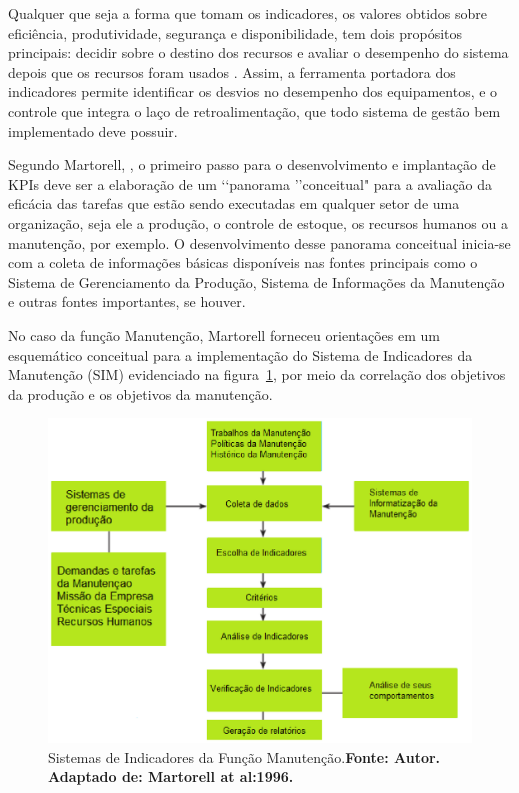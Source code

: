 Qualquer que seja a forma que tomam os indicadores, os valores obtidos sobre eficiência, produtividade, segurança e disponibilidade, tem dois propósitos principais: decidir sobre o destino dos recursos e avaliar o desempenho do sistema depois que os recursos foram usados \cite{lofsten1998}. Assim, a ferramenta portadora dos indicadores permite identificar os desvios no desempenho dos equipamentos, e o controle que integra o laço de retroalimentação, que todo sistema de gestão bem implementado deve possuir. 

Segundo Martorell, \cite{martorell1999}, o primeiro passo para o desenvolvimento e implantação de KPIs deve ser a elaboração de um \lq\lq panorama \rq\rq conceitual" para a avaliação da eficácia das tarefas que estão sendo executadas em qualquer setor de uma organização, seja ele a produção, o controle de estoque, os recursos humanos ou a manutenção, por exemplo. O desenvolvimento desse panorama conceitual inicia-se com a coleta de informações básicas disponíveis nas fontes principais como o Sistema de Gerenciamento da Produção, Sistema de Informações da Manutenção e outras fontes importantes, se houver.

No caso da função Manutenção, Martorell forneceu orientações em um esquemático conceitual para a implementação do Sistema de Indicadores da Manutenção (SIM) evidenciado na figura~\ref{Sistemas de Indicadores da Manutencao}, por meio da correlação dos objetivos da produção e os objetivos da manutenção.

\graphicspath{{figuras/}}
\begin{figure}[H]
\centering
\includegraphics[width=1\textwidth]{Sistemas_de_Indicadores_da_Manuten_o.eps}
\caption{Sistemas de Indicadores da Função Manutenção.\textbf{Fonte: Autor. Adaptado de: Martorell at al:1996.}}
\label{Sistemas de Indicadores da Manutencao}
\end{figure}

